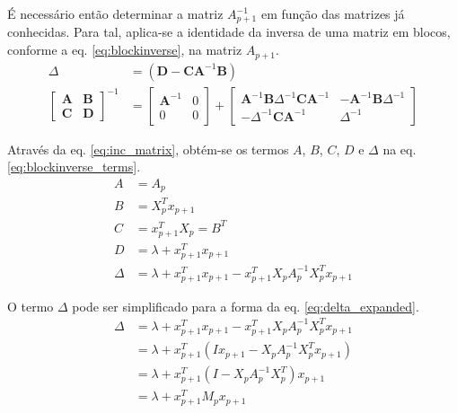 É necessário então determinar a matriz $A_{p+1}^{-1}$ em função das matrizes já conhecidas. Para tal, aplica-se 
a identidade da inversa de uma matriz em blocos, conforme a eq. \ref{eq:blockinverse}, na matriz $A_{p+1}$.
\smallskip
\begin{equation}
    \begin{split}
        \Delta &= (\mathbf{D}-\mathbf{CA}^{-1}\mathbf{B}) \\
        \begin{bmatrix}
            \mathbf{A} & \mathbf{B} \\ 
            \mathbf{C} & \mathbf{D} 
        \end{bmatrix}^{-1} &= 
        \begin{bmatrix} 
            \mathbf{A}^{-1} & 0 \\ 
            0 & 0 
        \end{bmatrix} +        
        \begin{bmatrix} 
            \mathbf{A}^{-1}\mathbf{B}\Delta^{-1}\mathbf{CA}^{-1} & -\mathbf{A}^{-1}\mathbf{B}\Delta^{-1} \\ 
            -\Delta^{-1}\mathbf{CA}^{-1} & \Delta^{-1} 
        \end{bmatrix}
    \end{split}
    \label{eq:blockinverse}
\end{equation}

Através da eq. \ref{eq:inc_matrix}, obtém-se os termos $A$, $B$, $C$, $D$ e $\Delta$ na eq. 
\ref{eq:blockinverse_terms}.
\smallskip
\begin{equation}
    \begin{split}
        A &= A_p \\
        B &= X_p^T x_{p+1} \\
        C &= x_{p+1}^T X_p = B^T \\
        D &= \lambda + x_{p+1}^T x_{p+1} \\
        \Delta &= \lambda + x_{p+1}^T x_{p+1} - x_{p+1}^T X_p A_p ^{-1} X_p^T x_{p+1}
    \end{split}
    \label{eq:blockinverse_terms}
\end{equation}

O termo $\Delta$ pode ser simplificado para a forma da eq. \ref{eq:delta_expanded}.
\begin{equation}
    \begin{split}
        \Delta &= \lambda + x_{p+1}^T x_{p+1} - x_{p+1}^T X_p A_p ^{-1} X_p^T x_{p+1} \\
                &= \lambda + x_{p+1}^T(I x_{p+1} - X_p A_p ^{-1} X_p^T x_{p+1}) \\
                &= \lambda + x_{p+1}^T(I - X_p A_p ^{-1} X_p^T)x_{p+1} \\
                &= \lambda + x_{p+1}^T M_p x_{p+1}
    \end{split}
    \label{eq:delta_expanded}
\end{equation}

